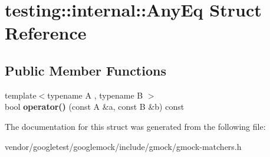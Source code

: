\hypertarget{structtesting_1_1internal_1_1AnyEq}{}\section{testing\+:\+:internal\+:\+:Any\+Eq Struct Reference}
\label{structtesting_1_1internal_1_1AnyEq}
\subsection*{Public Member Functions}
\begin{DoxyCompactItemize}
\item 
{\footnotesize template$<$typename A , typename B $>$ }\\bool {\bfseries operator()} (const A \&a, const B \&b) const \hypertarget{structtesting_1_1internal_1_1AnyEq_ac5ead0b65a46a4cde9cf7767d1c8a8c6}{}\label{structtesting_1_1internal_1_1AnyEq_ac5ead0b65a46a4cde9cf7767d1c8a8c6}

\end{DoxyCompactItemize}


The documentation for this struct was generated from the following file\+:\begin{DoxyCompactItemize}
\item 
vendor/googletest/googlemock/include/gmock/gmock-\/matchers.\+h\end{DoxyCompactItemize}
